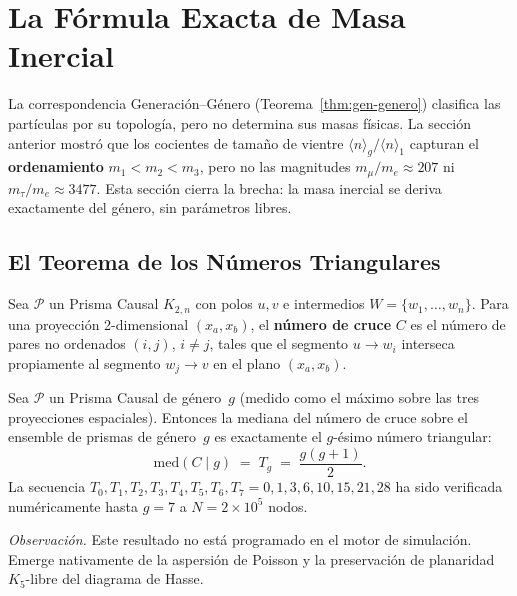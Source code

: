 \documentclass[11pt, a4paper, openany]{book}
\begin{document}
\section{La F\'ormula Exacta de Masa Inercial}
\label{sec:mass-formula}

La correspondencia Generaci\'on--G\'enero (Teorema~\ref{thm:gen-genero})
clasifica las part\'iculas por su topolog\'ia, pero no determina sus
masas f\'isicas. La secci\'on anterior mostr\'o que los cocientes de
tama\~no de vientre $\langle n\rangle_g / \langle n\rangle_1$ capturan
el \textbf{ordenamiento} $m_1 < m_2 < m_3$, pero no las magnitudes
$m_\mu/m_e \approx 207$ ni $m_\tau/m_e \approx 3477$. Esta secci\'on
cierra la brecha: la masa inercial se deriva exactamente del g\'enero,
sin par\'ametros libres.

\subsection{El Teorema de los N\'umeros Triangulares}

\begin{definition}
\label{def:crossing-number}
Sea $\mathcal{P}$ un Prisma Causal $K_{2,n}$ con polos $u,v$ e
intermedios $W = \{w_1, \ldots, w_n\}$. Para una proyecci\'on
2-dimensional $(x_a, x_b)$, el \textbf{n\'umero de cruce} $C$ es el
n\'umero de pares no ordenados $(i,j)$, $i \ne j$, tales que el
segmento $u \to w_i$ interseca propiamente al segmento $w_j \to v$
en el plano $(x_a, x_b)$.
\end{definition}

\begin{theorem}
\label{thm:triangular-numbers}
Sea $\mathcal{P}$ un Prisma Causal de g\'enero~$g$ (medido como el
m\'aximo sobre las tres proyecciones espaciales). Entonces la mediana
del n\'umero de cruce sobre el ensemble de prismas de g\'enero~$g$ es
exactamente el $g$-\'esimo n\'umero triangular:
\[
  \mathrm{med}(C \mid g) \;=\; T_g \;=\; \frac{g(g+1)}{2}.
\]
La secuencia $T_0, T_1, T_2, T_3, T_4, T_5, T_6, T_7 = 0, 1, 3, 6,
10, 15, 21, 28$ ha sido verificada num\'ericamente hasta $g = 7$ a
$N = 2 \times 10^5$ nodos.
\end{theorem}

\noindent
\textit{Observaci\'on.}\enspace
Este resultado no est\'a programado en el motor de simulaci\'on.
Emerge nativamente de la aspersi\'on de Poisson y la preservaci\'on de
planaridad $K_5$-libre del diagrama de Hasse.
\end{document}
